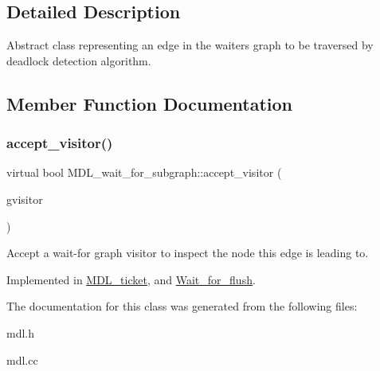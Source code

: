 \subsection{Detailed Description}
Abstract class representing an edge in the waiters graph to be traversed by deadlock detection algorithm. 

\subsection{Member Function Documentation}
\mbox{\label{classMDL__wait__for__subgraph_ad14f796a25430ecabd24572efa22f3f5}} 
\subsubsection{\texorpdfstring{accept\+\_\+visitor()}{accept\_visitor()}}
{\footnotesize\ttfamily virtual bool M\+D\+L\+\_\+wait\+\_\+for\+\_\+subgraph\+::accept\+\_\+visitor (\begin{DoxyParamCaption}\item[{\mbox{\hyperlink{classMDL__wait__for__graph__visitor}{M\+D\+L\+\_\+wait\+\_\+for\+\_\+graph\+\_\+visitor}} $\ast$}]{gvisitor }\end{DoxyParamCaption})\hspace{0.3cm}{\ttfamily [pure virtual]}}

Accept a wait-\/for graph visitor to inspect the node this edge is leading to. 

Implemented in \mbox{\hyperlink{classMDL__ticket_af1bd23371e97d8bf6b0ff9de43e7e418}{M\+D\+L\+\_\+ticket}}, and \mbox{\hyperlink{classWait__for__flush_a5d355af9c8dd888cf46b6c5c24552900}{Wait\+\_\+for\+\_\+flush}}.



The documentation for this class was generated from the following files\+:\begin{DoxyCompactItemize}
\item 
mdl.\+h\item 
mdl.\+cc\end{DoxyCompactItemize}
